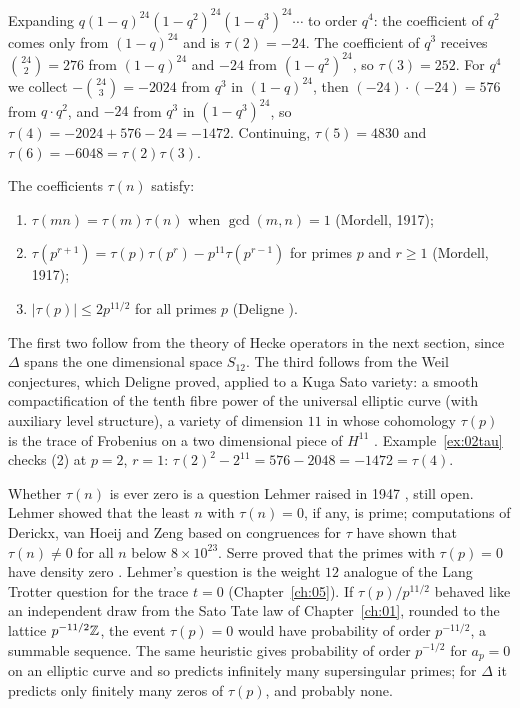 \begin{example}\label{ex:02tau}
Expanding $q(1-q)^{24}(1-q^2)^{24}(1-q^3)^{24}\cdots$ to order $q^4$: the coefficient of $q^2$ comes only from $(1-q)^{24}$ and is $\tau(2)=-24$. The coefficient of $q^3$ receives $\binom{24}{2}=276$ from $(1-q)^{24}$ and $-24$ from $(1-q^2)^{24}$, so $\tau(3)=252$. For $q^4$ we collect $-\binom{24}{3}=-2024$ from $q^3$ in $(1-q)^{24}$, then $(-24)\cdot(-24)=576$ from $q\cdot q^2$, and $-24$ from $q^3$ in $(1-q^3)^{24}$, so $\tau(4)=-2024+576-24=-1472$. Continuing, $\tau(5)=4830$ and $\tau(6)=-6048=\tau(2)\tau(3)$.
\end{example}

\begin{theorem}\label{thm:02ramanujan}
The coefficients $\tau(n)$ satisfy:
\begin{enumerate}
\item $\tau(mn)=\tau(m)\tau(n)$ when $\gcd(m,n)=1$ (Mordell, 1917);
\item $\tau(p^{r+1})=\tau(p)\tau(p^r)-p^{11}\tau(p^{r-1})$ for primes $p$ and $r\ge1$ (Mordell, 1917);
\item $|\tau(p)|\le2p^{11/2}$ for all primes $p$ (Deligne \cite{deligne1974}).
\end{enumerate}
\end{theorem}

The first two follow from the theory of Hecke operators in the next section, since $\Delta$ spans the one dimensional space $S_{12}$. The third follows from the Weil conjectures, which Deligne proved, applied to a Kuga Sato variety: a smooth compactification of the tenth fibre power of the universal elliptic curve (with auxiliary level structure), a variety of dimension $11$ in whose cohomology $\tau(p)$ is the trace of Frobenius on a two dimensional piece of $H^{11}$ \cite{deligne1971}. Example~\ref{ex:02tau} checks (2) at $p=2$, $r=1$: $\tau(2)^2-2^{11}=576-2048=-1472=\tau(4)$.

Whether $\tau(n)$ is ever zero is a question Lehmer raised in 1947 \cite{lehmer1947}, still open. Lehmer showed that the least $n$ with $\tau(n)=0$, if any, is prime; computations of Derickx, van Hoeij and Zeng \cite{derickx2013} based on congruences for $\tau$ have shown that $\tau(n)\neq0$ for all $n$ below $8\times10^{23}$. Serre proved that the primes with $\tau(p)=0$ have density zero \cite{serre1981}. Lehmer's question is the weight $12$ analogue of the Lang Trotter question for the trace $t=0$ (Chapter~\ref{ch:05}). If $\tau(p)/p^{11/2}$ behaved like an independent draw from the Sato Tate law of Chapter~\ref{ch:01}, rounded to the lattice $p^{-11/2}\mathbb{Z}$, the event $\tau(p)=0$ would have probability of order $p^{-11/2}$, a summable sequence. The same heuristic gives probability of order $p^{-1/2}$ for $a_p=0$ on an elliptic curve and so predicts infinitely many supersingular primes; for $\Delta$ it predicts only finitely many zeros of $\tau(p)$, and probably none.

